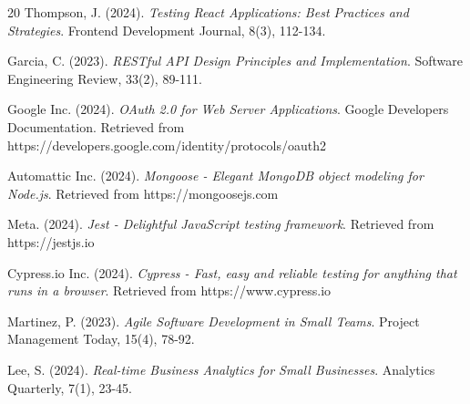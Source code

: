 \begin{thebibliography}{20}
Thompson, J. (2024). \textit{Testing React Applications: Best Practices and Strategies}. Frontend Development Journal, 8(3), 112-134.

Garcia, C. (2023). \textit{RESTful API Design Principles and Implementation}. Software Engineering Review, 33(2), 89-111.

Google Inc. (2024). \textit{OAuth 2.0 for Web Server Applications}. Google Developers Documentation. Retrieved from https://developers.google.com/identity/protocols/oauth2

Automattic Inc. (2024). \textit{Mongoose - Elegant MongoDB object modeling for Node.js}. Retrieved from https://mongoosejs.com

Meta. (2024). \textit{Jest - Delightful JavaScript testing framework}. Retrieved from https://jestjs.io

Cypress.io Inc. (2024). \textit{Cypress - Fast, easy and reliable testing for anything that runs in a browser}. Retrieved from https://www.cypress.io

Martinez, P. (2023). \textit{Agile Software Development in Small Teams}. Project Management Today, 15(4), 78-92.

Lee, S. (2024). \textit{Real-time Business Analytics for Small Businesses}. Analytics Quarterly, 7(1), 23-45.

\end{thebibliography}